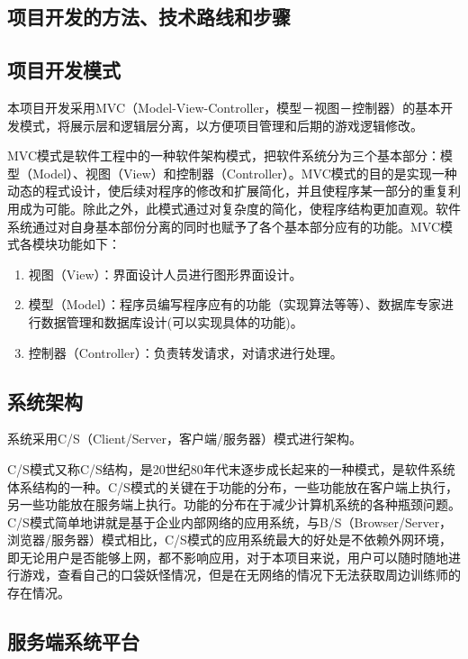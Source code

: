 \documentclass{article}
\begin{document}
\begin{CJK}{UTF8}{gbsn}
  \section{项目开发的方法、技术路线和步骤}
  \subsection{项目开发模式}

  本项目开发采用MVC（Model-View-Controller，模型－视图－控制器）的基本开发模式，将展示层和逻辑层分离，以方便项目管理和后期的游戏逻辑修改。

  MVC模式是软件工程中的一种软件架构模式，把软件系统分为三个基本部分：模型（Model）、视图（View）和控制器（Controller）。MVC模式的目的是实现一种动态的程式设计，使后续对程序的修改和扩展简化，并且使程序某一部分的重复利用成为可能。除此之外，此模式通过对复杂度的简化，使程序结构更加直观。软件系统通过对自身基本部份分离的同时也赋予了各个基本部分应有的功能。MVC模式各模块功能如下：
  \begin{enumerate}
    \item 视图（View）：界面设计人员进行图形界面设计。
    \item 模型（Model）：程序员编写程序应有的功能（实现算法等等）、数据库专家进行数据管理和数据库设计(可以实现具体的功能)。
    \item 控制器（Controller）：负责转发请求，对请求进行处理。
  \end{enumerate}

  \subsection{系统架构}

  系统采用C/S（Client/Server，客户端/服务器）模式进行架构。

  C/S模式又称C/S结构，是20世纪80年代末逐步成长起来的一种模式，是软件系统体系结构的一种。C/S模式的关键在于功能的分布，一些功能放在客户端上执行，另一些功能放在服务端上执行。功能的分布在于减少计算机系统的各种瓶颈问题。C/S模式简单地讲就是基于企业内部网络的应用系统，与B/S（Browser/Server，浏览器/服务器）模式相比，C/S模式的应用系统最大的好处是不依赖外网环境，即无论用户是否能够上网，都不影响应用，对于本项目来说，用户可以随时随地进行游戏，查看自己的口袋妖怪情况，但是在无网络的情况下无法获取周边训练师的存在情况。

  \subsection{服务端系统平台}


\end{CJK}
\end{document}
